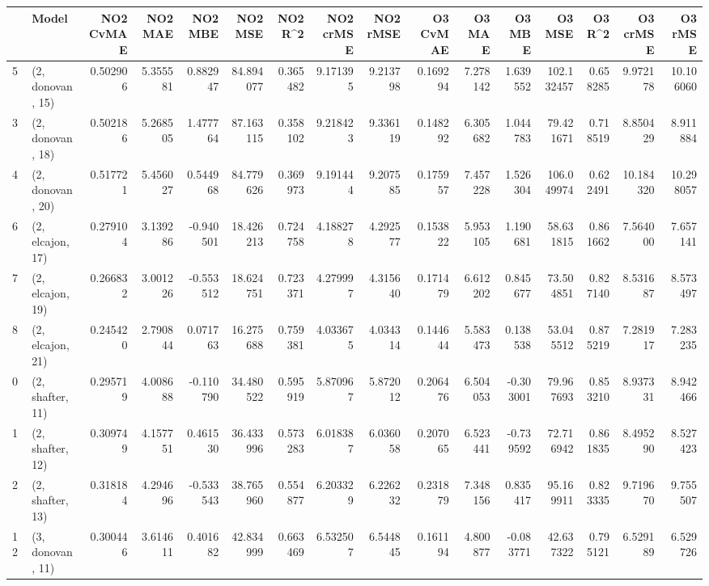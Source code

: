\begin{tabular}{llrrrrrrrrrrrrrr}
\toprule
{} &             Model &  NO2 CvMAE &   NO2 MAE &   NO2 MBE &    NO2 MSE &   NO2 R\textasciicircum2 &  NO2 crMSE &  NO2 rMSE &  O3 CvMAE &    O3 MAE &    O3 MBE &      O3 MSE &    O3 R\textasciicircum2 &   O3 crMSE &    O3 rMSE \\
\midrule
5  &  (2, donovan, 15) &   0.502906 &  5.355581 &  0.882947 &  84.894077 &  0.365482 &   9.171395 &  9.213798 &  0.169294 &  7.278142 &  1.639552 &  102.132457 &  0.658285 &   9.972178 &  10.106060 \\
3  &  (2, donovan, 18) &   0.502186 &  5.268505 &  1.477764 &  87.163115 &  0.358102 &   9.218423 &  9.336119 &  0.148292 &  6.305682 &  1.044783 &   79.421671 &  0.718519 &   8.850429 &   8.911884 \\
4  &  (2, donovan, 20) &   0.517721 &  5.456027 &  0.544968 &  84.779626 &  0.369973 &   9.191444 &  9.207585 &  0.175957 &  7.457228 &  1.526304 &  106.049974 &  0.622491 &  10.184320 &  10.298057 \\
6  &  (2, elcajon, 17) &   0.279104 &  3.139286 & -0.940501 &  18.426213 &  0.724758 &   4.188278 &  4.292577 &  0.153822 &  5.953105 &  1.190681 &   58.631815 &  0.861662 &   7.564000 &   7.657141 \\
7  &  (2, elcajon, 19) &   0.266832 &  3.001226 & -0.553512 &  18.624751 &  0.723371 &   4.279997 &  4.315640 &  0.171479 &  6.612202 &  0.845677 &   73.504851 &  0.827140 &   8.531687 &   8.573497 \\
8  &  (2, elcajon, 21) &   0.245420 &  2.790844 &  0.071763 &  16.275688 &  0.759381 &   4.033675 &  4.034314 &  0.144644 &  5.583473 &  0.138538 &   53.045512 &  0.875219 &   7.281917 &   7.283235 \\
0  &  (2, shafter, 11) &   0.295719 &  4.008688 & -0.110790 &  34.480522 &  0.595919 &   5.870967 &  5.872012 &  0.206476 &  6.504053 & -0.303001 &   79.967693 &  0.853210 &   8.937331 &   8.942466 \\
1  &  (2, shafter, 12) &   0.309749 &  4.157751 &  0.461530 &  36.433996 &  0.573283 &   6.018387 &  6.036058 &  0.207065 &  6.523441 & -0.739592 &   72.716942 &  0.861835 &   8.495290 &   8.527423 \\
2  &  (2, shafter, 13) &   0.318184 &  4.294696 & -0.533543 &  38.765960 &  0.554877 &   6.203329 &  6.226232 &  0.231879 &  7.348156 &  0.835417 &   95.169911 &  0.823335 &   9.719670 &   9.755507 \\
12 &  (3, donovan, 11) &   0.300446 &  3.614611 &  0.401682 &  42.834999 &  0.663469 &   6.532507 &  6.544845 &  0.161194 &  4.800877 & -0.083771 &   42.637322 &  0.795121 &   6.529189 &   6.529726 \\

\end{tabular}
